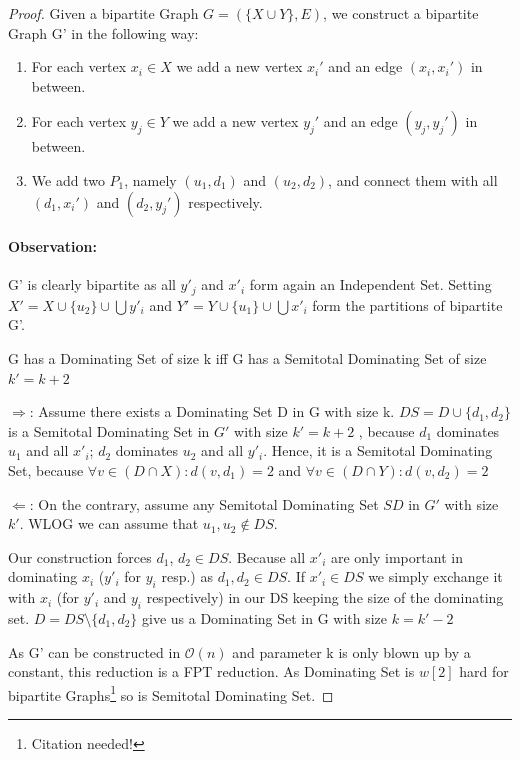 \begin{proof}
    Given a bipartite Graph $G = ( \{X \cup Y\}, E)$, we construct a bipartite Graph G' in the following way:
    \begin{enumerate}
        \item For each vertex $x_i \in X$ we add a new vertex $x_i'$  and an edge $(x_i, x_i')$ in between.
        \item For each vertex $y_j \in Y$ we add a new vertex $y_j'$ and an edge $(y_j, y_j')$ in between.
        \item We add two $P_1$, namely $(u_1, d_1)$ and $(u_2, d_2)$, and connect them with all $(d_1, x_i')$ and $(d_2, y_j')$ respectively.
    \end{enumerate}
    \paragraph*{Observation:} G' is clearly bipartite as all $y'_j$ and $x'_i$ form again an Independent Set. Setting  $X' = X \cup \{u_2\} \cup \bigcup y'_i$ and $Y' = Y \cup \{u_1\} \cup \bigcup {x'_i}$ form the partitions of bipartite G'.

    \begin{corollary} G has a Dominating Set of size k iff G has a Semitotal Dominating Set of size $k' = k + 2$
    \end{corollary} 
    $\Rightarrow$: Assume there exists a Dominating Set D in G with size k. $DS = D\cup \{d_1,d_2\}$ is a Semitotal Dominating Set in $G'$ with size $k' = k+2 $ , because $d_1$ dominates $u_1$ and all $x'_i$; $d_2$ dominates $u_2$ and all $y'_i$. Hence, it is a Semitotal Dominating Set, because $\forall v \in (D \cap X): d(v, d_1) = 2$ and $\forall v \in (D \cap Y): d(v, d_2) = 2$

    $\Leftarrow$: On the contrary, assume any Semitotal Dominating Set $SD$ in $G'$ with size $k'$. WLOG we can assume that $u_1, u_2 \notin DS$. 
    
    Our construction forces $d_1$, $d_2 \in DS$. Because all $x'_i$ are only important in dominating $x_i$ ($y'_i$ for $y_i$ resp.) as $d_1, d_2 \in DS$. If $x'_i \in DS$ we simply exchange it with $x_i$ (for $y'_i$ and $y_i$ respectively) in our DS keeping the size of the dominating set. $D = DS \setminus \{ d_1,d_2\}$ give us a Dominating Set in G with size $ k = k' - 2$

    As G' can be constructed in $\mathcal{O}(n)$ and parameter k is only blown up by a constant, this reduction is a FPT reduction. As Dominating Set is $w[2]$ hard for bipartite Graphs\footnote{Citation needed!} so is Semitotal Dominating Set.
\end{proof}

